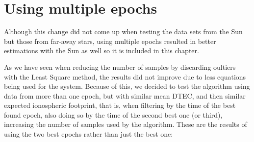 \clearpage

\section{Using multiple epochs}

Although this change did not come up when testing the data sets from the Sun but those from far-away stars, using multiple epochs resulted in better estimations with the Sun as well so it is included in this chapter.

As we have seen when reducing the number of samples by discarding oultiers with the Least Square method, the results did not improve due to less equations being used for the system. Because of this, we decided to test the algorithm using data from more than one epoch, but with similar mean DTEC, and then similar expected ionospheric footprint, that is, when filtering by the time of the best found epoch, also doing so by the time of the second best one (or third), increasing the number of samples used by the algorithm. These are the results of using the two best epochs rather than just the best one:

